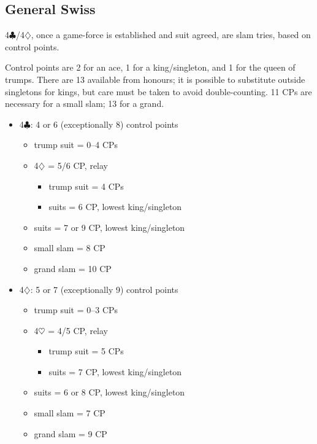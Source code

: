 \documentclass[a4paper,14pt]{extarticle}
\begin{document}
\newpage

\subsection{General Swiss}
\label{sec:swiss}
\label{note:19}

4$\clubsuit$/4$\diamondsuit$, once a game-force is established and suit agreed, are slam tries, based
on control points.

Control points are 2 for an ace, 1 for a king/singleton, and 1 for the queen of
trumps.  There are 13 available from honours; it is possible to substitute
outside singletons for kings, but care must be taken to avoid double-counting.
11 CPs are necessary for a small slam; 13 for a grand.

\begin{itemize}
\item 4$\clubsuit$: 4 or 6 (exceptionally 8) control points
	\begin{itemize}
   \item trump suit = 0--4 CPs
   \item 4$\diamondsuit$ = 5/6 CP, relay
		\begin{itemize}
      \item trump suit = 4 CPs
      \item suits = 6 CP, lowest king/singleton
		\end{itemize}
   \item suits = 7 or 9 CP, lowest king/singleton
   \item small slam = 8 CP
   \item grand slam = 10 CP
	\end{itemize}

\item 4$\diamondsuit$: 5 or 7 (exceptionally 9) control points
	\begin{itemize}
   \item trump suit = 0--3 CPs
   \item 4$\heartsuit$ = 4/5 CP, relay
		\begin{itemize}
      \item trump suit = 5 CPs
      \item suits = 7 CP, lowest king/singleton
		\end{itemize}
   \item suits = 6 or 8 CP, lowest king/singleton
   \item small slam = 7 CP
   \item grand slam = 9 CP
	\end{itemize}
\end{itemize}
\end{document}
